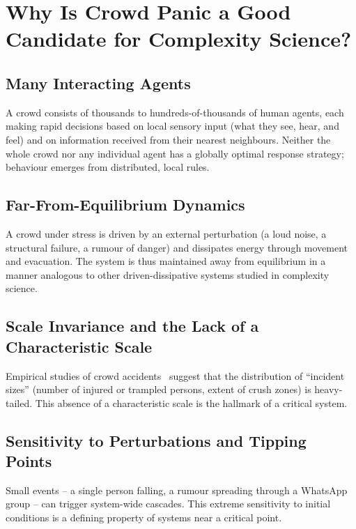\documentclass[12pt, a4paper]{article}
\begin{document}
\section{Why Is Crowd Panic a Good Candidate for Complexity Science?}
\label{sec:candidate}

\subsection{Many Interacting Agents}

A crowd consists of thousands to hundreds-of-thousands of human agents, each
making rapid decisions based on local sensory input (what they see, hear, and
feel) and on information received from their nearest neighbours.  Neither the
whole crowd nor any individual agent has a globally optimal response strategy;
behaviour emerges from distributed, local rules.

\subsection{Far-From-Equilibrium Dynamics}

A crowd under stress is driven by an external perturbation (a loud noise, a
structural failure, a rumour of danger) and dissipates energy through movement and
evacuation.  The system is thus maintained away from equilibrium in a manner
analogous to other driven-dissipative systems studied in complexity science.

\subsection{Scale Invariance and the Lack of a Characteristic Scale}

Empirical studies of crowd accidents~\cite{helbing2000} suggest that the
distribution of ``incident sizes'' (number of injured or trampled persons, extent
of crush zones) is heavy-tailed.  This absence of a characteristic scale is the
hallmark of a critical system.

\subsection{Sensitivity to Perturbations and Tipping Points}

Small events -- a single person falling, a rumour spreading through a WhatsApp
group -- can trigger system-wide cascades.  This extreme sensitivity to initial
conditions is a defining property of systems near a critical point.
\end{document}

